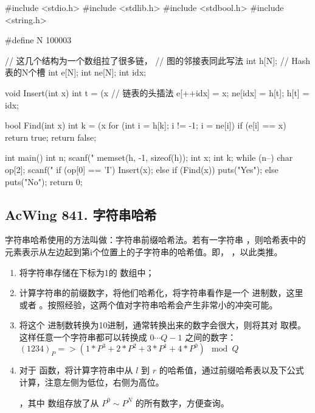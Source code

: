 \begin{mycpptwocol}[拉链法]
    #include <stdio.h>
    #include <stdlib.h>
    #include <stdbool.h>
    #include <string.h>

    #define N 100003

    // 这几个结构为一个数组拉了很多链，
    // 图的邻接表同此写法
    int h[N]; // Hash表的N个槽
    int e[N];
    int ne[N];
    int idx;

    void Insert(int x) {
        int t = (x %
        // 链表的头插法
        e[++idx] = x;
        ne[idx] = h[t];
        h[t] = idx;
    }

    bool Find(int x) {
        int k = (x %
        for (int i = h[k]; i != -1; i = ne[i]) {
            if (e[i] == x) {
                return true;
            }
        }
        return false;
    }

    int main() {
        int n;
        scanf("%
        memset(h, -1, sizeof(h));
        int x;
        int k;
        while (n--) {
            char op[2];
            scanf("%
            if (op[0] == 'I') {
                Insert(x);
            } else {
                if (Find(x)) {
                    puts("Yes");
                } else {
                    puts("No");
                }
            }
        }
        return 0;
    }
\end{mycpptwocol}

\subsection{AcWing 841. 字符串哈希}

字符串哈希使用的方法叫做：字符串前缀哈希法。若有一字符串 ，则哈希表中的元素表示从左边起到第i个位置上的子字符串的哈希值。即， ，以此类推。

\begin{enumerate}
    \item 将字符串存储在下标为1的  数组中；
    \item 计算字符串的前缀数字，将他们哈希化，将字符串看作是一个  进制数，这里  或者 。按照经验，这两个值对字符串哈希会产生非常小的冲突可能。
    \item 将这个  进制数转换为10进制，通常转换出来的数字会很大，则将其对  取模。这样任意一个字符串都可以转换成 $0 \cdots Q - 1$ 之间的数字：$(1234)_P => (1 * P^3 + 2 * P^2 + 3 * P^1 + 4 * P^0) \mod Q$
    \item 对于  函数，将计算字符串中从 $l$ 到 $r$ 的哈希值，通过前缀哈希表以及下公式计算，注意左侧为低位，右侧为高位。

     ，其中  数组存放了从 $P^0 \sim P^N$ 的所有数字，方便查询。
\end{enumerate}

